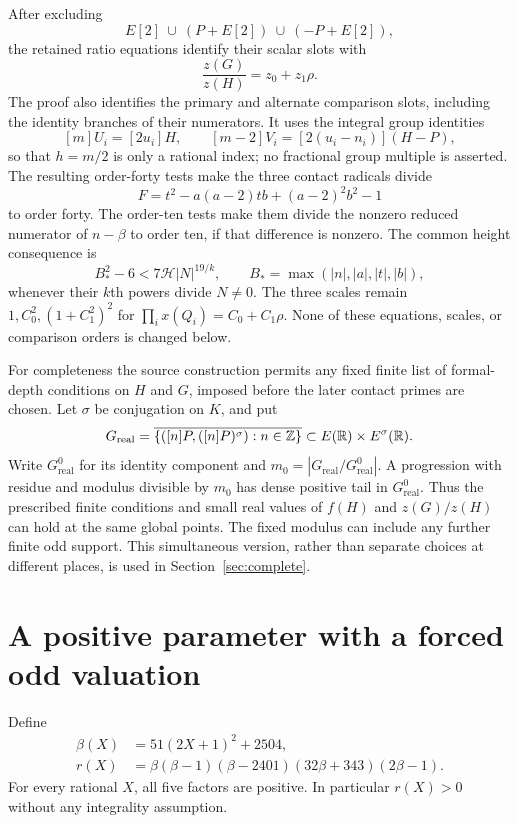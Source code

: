 \documentclass[11pt,a4paper]{article}
\theoremstyle{definition}\newtheorem{definition}[theorem]{Definition}
\theoremstyle{remark}\newtheorem{remark}[theorem]{Remark}
\newcommand{\HH}{\mathcal H}\newcommand{\ord}{\operatorname{ord}}
\begin{document}
After excluding
\begin{equation}\label{eq:exceptional}
 E[2]\ \cup\ (P+E[2])\ \cup\ (-P+E[2]),
\end{equation}
the retained ratio equations identify their scalar slots with
\[
                  \frac{z(G)}{z(H)}=z_0+z_1\rho.
\]
The proof also identifies the primary and alternate comparison slots,
including the identity branches of their numerators. It uses the integral
group identities
\[
 [m]U_i=[2u_i]H,\qquad
 [m-2]V_i=[2(u_i-n_i)](H-P),
\]
so that $h=m/2$ is only a rational index; no fractional group multiple is
asserted. The resulting order-forty tests make the three contact radicals
divide
\begin{equation}\label{eq:F}
 F=t^2-a(a-2)tb+(a-2)^2b^2-1
\end{equation}
to order forty. The order-ten tests make them divide the nonzero reduced
numerator of $n-\beta$ to order ten, if that difference is nonzero.
The common height consequence is
\begin{equation}\label{eq:height}
 B_*^2-6<7\HH |N|^{19/k},\qquad
 B_* =\max(|n|,|a|,|t|,|b|),
\end{equation}
whenever their $k$th powers divide $N\ne0$. The three scales remain
$1,C_0^2,(1+C_1^2)^2$ for
$\prod_i x(Q_i)=C_0+C_1\rho$.
None of these equations, scales, or comparison orders is changed below.

For completeness the source construction permits any fixed finite list
of formal-depth conditions on $H$ and $G$, imposed before the later
contact primes are chosen. Let $\sigma$ be conjugation on $K$, and put
\[
 G_{\mathrm{real}}
 =\overline{\{([n]P,([n]P)^\sigma):n\in\mathbb Z\}}
 \subset E(\mathbb R)\times E^\sigma(\mathbb R).
\]
Write $G_{\mathrm{real}}^0$ for its identity component and
$m_0=|G_{\mathrm{real}}/G_{\mathrm{real}}^0|$.
A progression with residue and modulus divisible by $m_0$ has dense
positive tail in $G_{\mathrm{real}}^0$.
Thus the prescribed finite conditions and small real values
of $f(H)$ and $z(G)/z(H)$ can hold at the same global points. The fixed
modulus can include any further finite odd support. This simultaneous
version, rather than separate choices at different places, is used in
Section~\ref{sec:complete}.

\section{A positive parameter with a forced odd valuation}
Define
\begin{align}
 \beta(X)&=51(2X+1)^2+2504,\label{eq:beta}\\
 r(X)&=\beta(\beta-1)(\beta-2401)(32\beta+343)(2\beta-1).\label{eq:r}
\end{align}
For every rational $X$, all five factors are positive. In particular
$r(X)>0$ without any integrality assumption.
\end{document}
